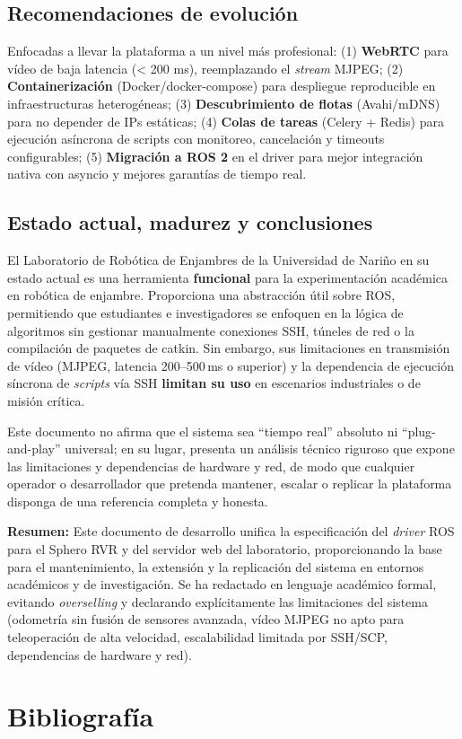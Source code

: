 \documentclass[12pt]{article}
\numberwithin{figure}{section}
\numberwithin{table}{section}
\begin{document}
\subsection{Recomendaciones de evolución}

Enfocadas a llevar la plataforma a un nivel más profesional: (1) \textbf{WebRTC} para vídeo de baja latencia (< 200 ms), reemplazando el \textit{stream} MJPEG; (2) \textbf{Containerización} (Docker/docker-compose) para despliegue reproducible en infraestructuras heterogéneas; (3) \textbf{Descubrimiento de flotas} (Avahi/mDNS) para no depender de IPs estáticas; (4) \textbf{Colas de tareas} (Celery + Redis) para ejecución asíncrona de scripts con monitoreo, cancelación y timeouts configurables; (5) \textbf{Migración a ROS 2} en el driver para mejor integración nativa con asyncio y mejores garantías de tiempo real.


\subsection{Estado actual, madurez y conclusiones}

El Laboratorio de Robótica de Enjambres de la Universidad de Nariño en su estado actual es una herramienta \textbf{funcional} para la experimentación académica en robótica de enjambre. Proporciona una abstracción útil sobre ROS, permitiendo que estudiantes e investigadores se enfoquen en la lógica de algoritmos sin gestionar manualmente conexiones SSH, túneles de red o la compilación de paquetes de catkin. Sin embargo, sus limitaciones en transmisión de vídeo (MJPEG, latencia 200--500\,ms o superior) y la dependencia de ejecución síncrona de \textit{scripts} vía SSH \textbf{limitan su uso} en escenarios industriales o de misión crítica.

Este documento no afirma que el sistema sea ``tiempo real'' absoluto ni ``plug-and-play'' universal; en su lugar, presenta un análisis técnico riguroso que expone las limitaciones y dependencias de hardware y red, de modo que cualquier operador o desarrollador que pretenda mantener, escalar o replicar la plataforma disponga de una referencia completa y honesta.

\begin{infobox}
\textbf{Resumen:} Este documento de desarrollo unifica la especificación del \textit{driver} ROS para el Sphero RVR y del servidor web del laboratorio, proporcionando la base para el mantenimiento, la extensión y la replicación del sistema en entornos académicos y de investigación. Se ha redactado en lenguaje académico formal, evitando \textit{overselling} y declarando explícitamente las limitaciones del sistema (odometría sin fusión de sensores avanzada, vídeo MJPEG no apto para teleoperación de alta velocidad, escalabilidad limitada por SSH/SCP, dependencias de hardware y red).
\end{infobox}


\section{Bibliografía}


\printbibliography
\end{document}
